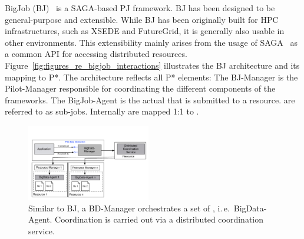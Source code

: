 \documentclass[conference]{IEEEtran}
\begin{document}



BigJob (BJ)~\cite{bigjob_web,saga_bigjob_condor_cloud} is a SAGA-based PJ
framework. BJ has been designed to be general-purpose and extensible. While BJ
has been originally built for HPC infrastructures, such as XSEDE and
FutureGrid, it is generally also usable in other environments. This
extensibility mainly arises from the usage of SAGA~\cite{saga_url,ogf-gfd-90} 
as a common API for accessing distributed resources. 
Figure~\ref{fig:figures_re_bigjob_interactions} illustrates the
BJ architecture and its mapping to P*. The architecture reflects
all P* elements: The BJ-Manager is the Pilot-Manager responsible for
coordinating the different components of the frameworks. The
BigJob-Agent is the actual \pilot that is submitted to a
resource. \cus are referred to as sub-jobs. Internally \cus are mapped
1:1 to \sus.


\begin{figure}[t]
	\up\up\upp
	\centering
	\includegraphics[width=0.48\textwidth]{../figures/bigdata_pmr.pdf}
	\caption{ Similar to BJ, a BD-Manager orchestrates a set of \pilots, i.\,e.\ BigData-Agent. Coordination is carried out via a distributed coordination service. \up\up }
	\label{fig:bigdata}
\end{figure}
\end{document}

